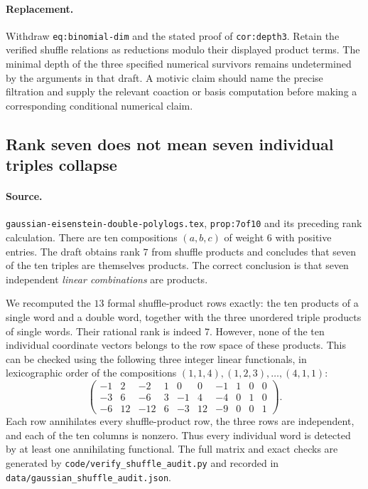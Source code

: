 \documentclass[11pt,a4paper]{article}
\theoremstyle{definition}
\theoremstyle{remark}
\numberwithin{equation}{section}
\begin{document}
\paragraph{Replacement.}
Withdraw \texttt{eq:binomial-dim} and the stated proof of
\texttt{cor:depth3}. Retain the verified shuffle relations as reductions
modulo their displayed product terms. The minimal depth of the three
specified numerical survivors remains undetermined by the arguments in
that draft. A motivic claim should name the precise filtration and supply
the relevant coaction or basis computation before making a corresponding
conditional numerical claim.

\subsection{Rank seven does not mean seven individual triples collapse}
\label{audit:poly:shuffle-rank}

\paragraph{Source.}
\texttt{gaussian-eisenstein-double-polylogs.tex},
\texttt{prop:7of10} and its preceding rank calculation.
There are ten compositions $(a,b,c)$ of weight $6$ with positive entries.
The draft obtains rank $7$ from shuffle products and concludes that seven
of the ten triples are themselves products. The correct conclusion is
that seven independent \emph{linear combinations} are products.

We recomputed the $13$ formal shuffle-product rows exactly: the ten
products of a single word and a double word, together with the three
unordered triple products of single words. Their rational rank is indeed
$7$. However, none of the ten individual coordinate vectors belongs to
the row space of these products.
This can be checked using the following three integer linear functionals,
in lexicographic order of the compositions
$(1,1,4),(1,2,3),\ldots,(4,1,1)$:
\[
 \begin{pmatrix}
 -1&2&-2&1&0&0&-1&1&0&0\\
 -3&6&-6&3&-1&4&-4&0&1&0\\
 -6&12&-12&6&-3&12&-9&0&0&1
 \end{pmatrix}.
\]
Each row annihilates every shuffle-product row, the three rows are
independent, and each of the ten columns is nonzero.
Thus every individual word is detected by at least one annihilating
functional. The full matrix and exact checks are generated by
\texttt{code/verify\_shuffle\_audit.py} and recorded in
\texttt{data/gaussian\_shuffle\_audit.json}.
\end{document}
